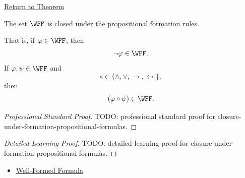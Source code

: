 \newpage
{}
\label{prf:closure-under-formation-propositional-formulas}

\begin{remark*}[Return]
\hyperref[lem:closure-under-formation-propositional-formulas]{Return to Theorem}
\end{remark*}


\begin{lemma*}
The set \(\WFF\) is closed under the propositional formation rules.

That is, if \(\varphi\in\WFF\), then
\[
\neg\varphi\in\WFF.
\]
If \(\varphi,\psi\in\WFF\) and
\[
\circ\in\{\land,\lor,\to,\leftrightarrow\},
\]
then
\[
(\varphi\circ\psi)\in\WFF.
\]
\end{lemma*}

\begin{proof}[Professional Standard Proof]
\LRAProofBodyStart
TODO: professional standard proof for closure-under-formation-propositional-formulas.
\end{proof}

\begin{proof}[Detailed Learning Proof]
\LRAProofBodyStart
TODO: detailed learning proof for closure-under-formation-propositional-formulas.
\end{proof}

\begin{remark*}

\end{remark*}

\begin{dependencies}
\begin{itemize}
  \item \hyperref[def:well-formed-formula]{Well-Formed Formula}
\end{itemize}
\end{dependencies}

\clearpage
